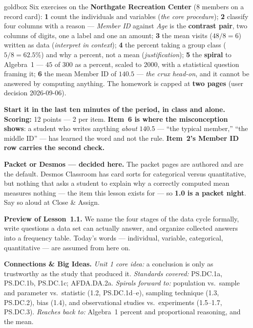 \documentclass[10pt]{article}
\begin{document}
\boxguard
\begin{skillbox}{goldbox}
Six exercises on the \textbf{Northgate Recreation Center} ($8$ members on a record card):
\textbf{1} count the individuals and variables (\emph{the core procedure}); \textbf{2}
classify four columns with a reason --- \emph{Member ID} against \emph{Age} is the
\textbf{contrast pair}, two columns of digits, one a label and one an amount; \textbf{3} the
mean visits ($48/8 = 6$) written as data (\emph{interpret in context}); \textbf{4} the
percent taking a group class ($5/8 = 62.5\%$) and why a percent, not a mean
(\emph{justification}); \textbf{5} the \textbf{spiral} to Algebra~1 --- $45$ of $300$ as a
percent, scaled to $2000$, with a statistical question framing it; \textbf{6} the mean Member
ID of $140.5$ --- \emph{the crux head-on}, and it cannot be answered by computing anything.
The homework is capped at \textbf{two pages} (user decision 2026-09-06).

\textbf{Start it in the last ten minutes of the period, in class and alone.} \textbf{Scoring:}
12 points --- 2 per item. \textbf{Item~6 is where the misconception shows}: a student who
writes anything \emph{about} $140.5$ --- ``the typical member,'' ``the middle ID'' --- has
learned the word and not the rule. \textbf{Item~2's Member ID row carries the second check.}

\textbf{Packet or Desmos --- decided here.} The packet pages are authored and are the default.
Desmos Classroom has card sorts for categorical versus quantitative, but nothing that asks a
student to explain why a correctly computed mean measures nothing --- the item this lesson
exists for --- so \textbf{1.0 is a packet night}. Say so aloud at Close \& Assign.

\textbf{Preview of Lesson~1.1.} We name the four stages of the data cycle formally, write
questions a data set can actually answer, and organize collected answers into a frequency
table. Today's words --- individual, variable, categorical, quantitative --- are assumed from
here on.

\textbf{Connections \& Big Ideas.} \textit{Unit 1 core idea:} a conclusion is only as
trustworthy as the study that produced it. \textit{Standards covered:} PS.DC.1a, PS.DC.1b,
PS.DC.1c; AFDA.DA.2a. \textit{Spirals forward to:} population vs.\ sample and parameter vs.\
statistic (1.2, PS.DC.1d--e), sampling technique (1.3, PS.DC.2), bias (1.4), and
observational studies vs.\ experiments (1.5--1.7, PS.DC.3). \textit{Reaches back to:}
Algebra~1 percent and proportional reasoning, and the mean.
\end{skillbox}
\end{document}
